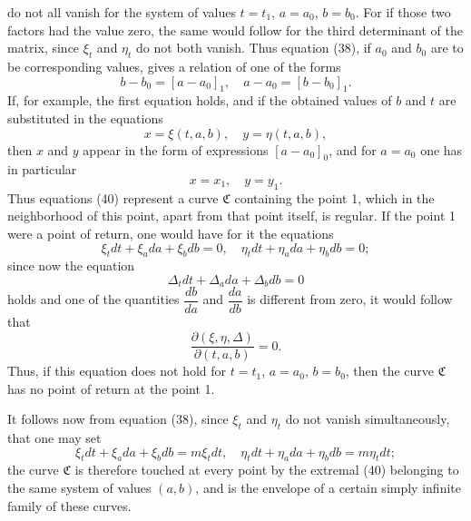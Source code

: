 \documentclass[11pt,a4paper,leqno]{article}
\begin{document}
do not all vanish for the system of values $t=t_1$, $a=a_0$, $b=b_0$. For if those two factors had the value zero, the same would follow for the third determinant of the matrix, since $\xi_t$ and $\eta_t$ do not both vanish. Thus equation (38), if $a_0$ and $b_0$ are to be corresponding values, gives a relation of one of the forms
\[
b-b_0=[a-a_0]_1,\quad a-a_0=[b-b_0]_1.
\]
If, for example, the first equation holds, and if the obtained values of $b$ and $t$ are substituted in the equations
\begin{equation}\tag{40}
x=\xi(t,a,b),\quad y=\eta(t,a,b),
\end{equation}
then $x$ and $y$ appear in the form of expressions $[a-a_0]_0$, and for $a=a_0$ one has in particular
\[
x=x_1,\quad y=y_1.
\]
Thus equations (40) represent a curve $\mathfrak{C}$ containing the point 1, which in the neighborhood of this point, apart from
that point itself, is regular. If the point 1 were a point of return, one would have for it the equations
\[
\xi_tdt+\xi_a da+\xi_b db=0,\quad \eta_tdt+\eta_a da+\eta_b db=0;
\]
since now the equation
\[
\Delta_tdt+\Delta_a da+\Delta_b db=0
\]
holds and one of the quantities $\dfrac{db}{da}$ and $\dfrac{da}{db}$ is different from zero, it would follow that
\begin{equation}\tag{41}
\frac{\partial(\xi,\eta,\Delta)}{\partial(t,a,b)}=0.
\end{equation}
Thus, if this equation does not hold for $t=t_1$, $a=a_0$, $b=b_0$, then the curve $\mathfrak{C}$ has no point of return at the point 1.

It follows now from equation (38), since $\xi_t$ and $\eta_t$ do not vanish simultaneously, that one may set
\begin{equation}\tag{42}
\xi_tdt+\xi_a da+\xi_b db=m\xi_tdt,\quad
\eta_tdt+\eta_a da+\eta_b db=m\eta_tdt;
\end{equation}
the curve $\mathfrak{C}$ is therefore touched at every point by the extremal (40) belonging to the same system of values $(a,b)$, and is the envelope of a certain simply infinite family of these curves.
\end{document}
